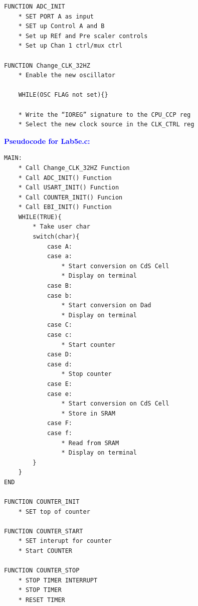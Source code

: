 \documentclass[11pt]{article}
\theoremstyle{plain}
\theoremstyle{definition}
\begin{document}
\begin{tcolorbox}
\begin{verbatim}
FUNCTION ADC_INIT
    * SET PORT A as input
    * SET up Control A and B
    * Set up REf and Pre scaler controls
    * Set up Chan 1 ctrl/mux ctrl

FUNCTION Change_CLK_32HZ
    * Enable the new oscillator

    WHILE(OSC FLAG not set){}

    * Write the “IOREG” signature to the CPU_CCP reg
    * Select the new clock source in the CLK_CTRL reg
\end{verbatim}
\end{tcolorbox}
%
%
\newpage
\textbf{\textcolor{blue}{Pseudocode for Lab5e.c:}}
\begin{tcolorbox}
\begin{verbatim}
MAIN:
    * Call Change_CLK_32HZ Function
    * Call ADC_INIT() Function
    * Call USART_INIT() Function
    * Call COUNTER_INIT() Funcion
    * Call EBI_INIT() Function
    WHILE(TRUE){
    	* Take user char
        switch(char){
            case A:
            case a:
                * Start conversion on CdS Cell	
                * Display on terminal
    	    case B:
    	    case b:
                * Start conversion on Dad
                * Display on terminal
    	    case C:
    	    case c:
                * Start counter
    	    case D:
    	    case d:
                * Stop counter
    	    case E: 
    	    case e: 
                * Start conversion on CdS Cell
                * Store in SRAM
    	    case F:
    	    case f:
                * Read from SRAM
                * Display on terminal     	            
        }
    }
END

FUNCTION COUNTER_INIT
    * SET top of counter
    
FUNCTION COUNTER_START
    * SET interupt for counter
    * Start COUNTER
        
FUNCTION COUNTER_STOP
    * STOP TIMER INTERRUPT
    * STOP TIMER
    * RESET TIMER
\end{verbatim}
\end{tcolorbox}


    
\end{document}
